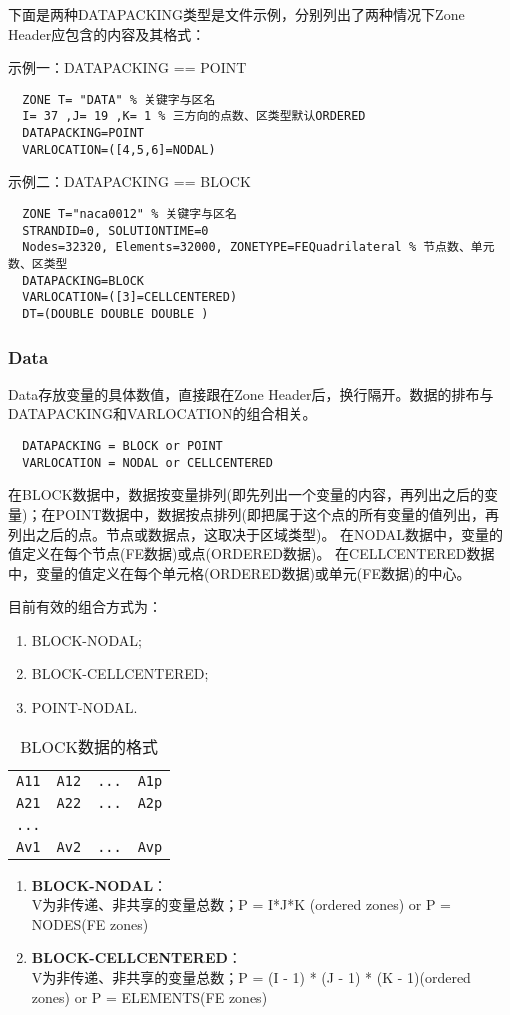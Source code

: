 \documentclass[lang=cn,11pt,a4paper]{elegantpaper}
\begin{document}
下面是两种DATAPACKING类型是文件示例，分别列出了两种情况下Zone Header应包含的内容及其格式：

示例一：DATAPACKING == POINT
\begin{lstlisting}
  ZONE T= "DATA" % 关键字与区名
  I= 37 ,J= 19 ,K= 1 % 三方向的点数、区类型默认ORDERED
  DATAPACKING=POINT
  VARLOCATION=([4,5,6]=NODAL)
\end{lstlisting}

示例二：DATAPACKING == BLOCK
\begin{lstlisting}
  ZONE T="naca0012" % 关键字与区名
  STRANDID=0, SOLUTIONTIME=0
  Nodes=32320, Elements=32000, ZONETYPE=FEQuadrilateral % 节点数、单元数、区类型
  DATAPACKING=BLOCK
  VARLOCATION=([3]=CELLCENTERED)
  DT=(DOUBLE DOUBLE DOUBLE )
\end{lstlisting}

\subsubsection{Data}\label{data}
Data存放变量的具体数值，直接跟在Zone Header后，换行隔开。数据的排布与DATAPACKING和VARLOCATION的组合相关。
\begin{lstlisting}
  DATAPACKING = BLOCK or POINT
  VARLOCATION = NODAL or CELLCENTERED
\end{lstlisting}
在BLOCK数据中，数据按变量排列(即先列出一个变量的内容，再列出之后的变量)；在POINT数据中，数据按点排列(即把属于这个点的所有变量的值列出，再列出之后的点。节点或数据点，这取决于区域类型)。
在NODAL数据中，变量的值定义在每个节点(FE数据)或点(ORDERED数据)。 在CELLCENTERED数据中，变量的值定义在每个单元格(ORDERED数据)或单元(FE数据)的中心。

目前有效的组合方式为：
\begin{enumerate}
  \item BLOCK-NODAL;
  \item BLOCK-CELLCENTERED;
  \item POINT-NODAL.
\end{enumerate}

\begin{table}[!htb]
  \centering
  \caption{BLOCK数据的格式}
  \label{block}
  \begin{tabular}{*{4}{c}}
   \hline
   \texttt{A11} & \texttt{A12} & \texttt{...}  & \texttt{A1p} \\
   \texttt{A21} & \texttt{A22} & \texttt{...} & \texttt{A2p} \\
   \texttt{...} & \texttt{~} & \texttt{~} & \texttt{~} \\
   \texttt{Av1} & \texttt{Av2} & \texttt{...} & \texttt{Avp} \\
   \hline
  \end{tabular}
\end{table}
\begin{enumerate}
  \item \textbf{BLOCK-NODAL}：\\
  V为非传递、非共享的变量总数；P = I*J*K (ordered zones) or P = NODES(FE zones)
  \item \textbf{BLOCK-CELLCENTERED}：\\
  V为非传递、非共享的变量总数；P = (I - 1) * (J - 1) * (K - 1)(ordered zones) or P = ELEMENTS(FE zones)
\end{enumerate}
\end{document}
